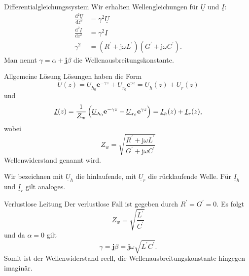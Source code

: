 \documentclass{beamer}
\begin{document}
\begin{frame}{Differentialgleichungssystem}
Wir erhalten Wellengleichungen für $\underline{U}$ und $\underline{I}$:
\begin{align}
    \frac{\text{d}^{2} \underline{U}}{\text{d} z^{2}} &= \gamma^{2} \underline{U} \label{eq:VerlustDgl1} \\[1ex]
    \frac{\text{d}^{2} \underline{I}}{\text{d} z^{2}} &= \gamma^{2} \underline{I} \label{eq:VerlustDgl2} \\[1ex]
    \gamma^{2} &= \left( R^{\prime} + \mathrm{j} \omega L^{\prime} \right) \left( G^{\prime} + \mathrm{j} \omega
    C^{\prime} \right) \label{eq:Gamma}.
\end{align}
Man nennt $\gamma = \alpha + \mathbf{j} \beta$ die Wellenausbreitungskonstante.

\end{frame}


\begin{frame}{Allgemeine Lösung}
    Lösungen haben die Form
    \begin{equation}
        \underline{U}(z) = \underline{U}_{h_{0}} \mathbf{e}^{- \gamma z}
        +
        \underline{U}_{r_{0}} \mathbf{e}^{\gamma z}
        = \underline{U}_{h}(z) + \underline{U}_{r}(z) \label{eq:VerlustU}
    \end{equation}
    und
    \begin{equation}
        \underline{I}(z) = \frac{1}{Z_{w}} \left( \vphantom{\sqrt{1}{Z}}
        \underline{U}_{h_{0}} \mathbf{e}^{- \gamma z} - \underline{U}_{r_{0}} \mathbf{e}^{\gamma z} \right)
        = \underline{I}_{h}(z) + \underline{I}_{r}(z), \label{eq:VerlustI}
    \end{equation}
    wobei
    \begin{equation}
        Z_{w} = \sqrt{\frac{R^{\prime} + \mathrm{j} \omega L^{\prime}}{G^{\prime} + \mathrm{j} \omega C^{\prime}}}
        \label{eq:Zw}
    \end{equation}
    Wellenwiderstand genannt wird.


    Wir bezeichnen mit $\underline{U}_{h}$ die \alert{hinlaufende}, mit $\underline{U}_{r}$ die
    \alert{rücklaufende} Welle. Für $\underline{I}_{h}$ und $\underline{I}_{r}$ gilt analoges.

\end{frame}


\begin{frame}{Verlustlose Leitung}
Der verlustlose Fall ist gegeben durch \mbox{$R^{\prime} = G^{\prime} = 0$}.
Es folgt
\[
Z_{w} = \sqrt{\frac{L^{\prime}}{C^{\prime}}}
\]
und da $\alpha = 0$ gilt
\[
\gamma = \mathbf{j} \beta = \mathbf{j} \omega \sqrt{L^{\prime} C^{\prime}}.
\]
Somit ist der Wellenwiderstand \alert{reell}, die Wellenausbreitungskonstante hingegen
\alert{imaginär}.
\end{frame}
\end{document}
